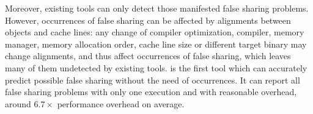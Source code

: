 Moreover, existing tools can only detect those manifested false sharing problems.
However, occurrences of false sharing can be affected by alignments between
objects and cache lines: any change of compiler optimization, compiler, memory manager, 
memory allocation order, cache line size or different target binary 
may change alignments, and thus affect occurrences of false sharing, 
which leaves many of them undetected by existing tools.
\Predator{} is the first tool which can accurately predict possible false sharing 
without the need of occurrences. 
It can report all false sharing problems with only one execution and with reasonable overhead, 
around $6.7\times$ performance overhead on average.


